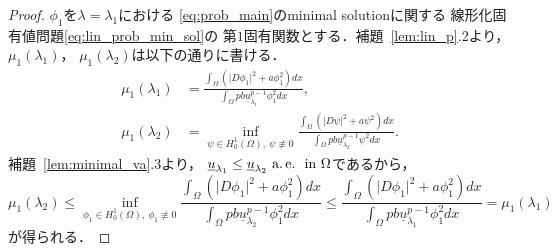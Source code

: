 \begin{proof}
 $\phi_1$を$\lambda = \lambda_1$における
 \ref{eq:prob_main}のminimal solutionに関する
 線形化固有値問題\eqref{eq:lin_prob_min_sol}の
 第$1$固有関数とする．補題~\ref{lem:lin_p}.2より，$\mu_1(\lambda_1)$，
 $\mu_1(\lambda_2)$は以下の通りに書ける．
 \begin{align*}
  \mu_1(\lambda_1) &= \frac{\displaystyle 
  \int_\Omega \left( \lvert D\phi_1 \rvert^2
  + a \phi_1^2 \right) dx}{\displaystyle \int_\Omega p b
  \underline{u}_{\lambda_1}^{p-1} \phi_1^2 dx}, \\
  \mu_1(\lambda_2) &= \inf_{\psi \in H_0^1(\Omega), \ \psi \not\equiv
  0} \frac{\displaystyle 
  \int_\Omega \left( \lvert D\psi \rvert^2
  + a \psi^2 \right) dx}{\displaystyle \int_\Omega p b
  \underline{u}_{\lambda_2}^{p-1} \psi^2 dx}.
 \end{align*}
 補題~\ref{lem:minimal_va}.3より，
 $\underline{u}_{\lambda_1} \leq \underline{u}_{\lambda_2} ~\text{a.\,e.}~ ~\text{in}~
 \Omega$であるから，
 \[
  \mu_1(\lambda_2) \leq 
  \inf_{\phi_1 \in H_0^1(\Omega), \ \phi_1 \not\equiv
  0} \frac{\displaystyle 
  \int_\Omega \left( \lvert D\phi_1 \rvert^2
  + a \phi_1^2 \right) dx}{\displaystyle \int_\Omega p b
  \underline{u}_{\lambda_2}^{p-1} \phi_1^2 dx} \leq
  \frac{\displaystyle 
  \int_\Omega \left( \lvert D\phi_1 \rvert^2
  + a \phi_1^2 \right) dx}{\displaystyle \int_\Omega p b
  \underline{u}_{\lambda_1}^{p-1} \phi_1^2 dx} = \mu_1(\lambda_1)
 \]
 が得られる． \qedhere
\end{proof}

